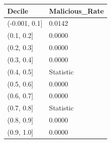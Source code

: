 \begin{tabular}{ll}
\toprule
Decile & Malicious\_Rate \\
\midrule
(-0.001, 0.1] & 0.0142 \\
(0.1, 0.2] & 0.0000 \\
(0.2, 0.3] & 0.0000 \\
(0.3, 0.4] & 0.0000 \\
(0.4, 0.5] & Statistic \\
(0.5, 0.6] & 0.0000 \\
(0.6, 0.7] & 0.0000 \\
(0.7, 0.8] & Statistic \\
(0.8, 0.9] & 0.0000 \\
(0.9, 1.0] & 0.0000 \\
\bottomrule
\end{tabular}